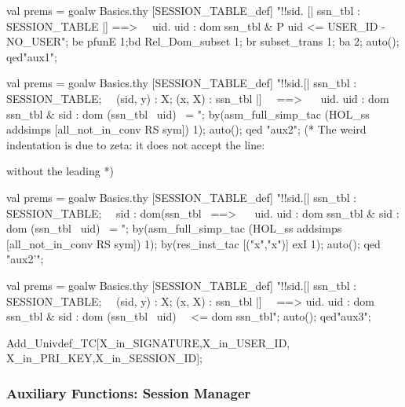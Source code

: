 \documentclass[a4paper,pdftex]{article}
\newenvironment{holz-proof}{\comment}{\endcomment}
\begin{document}
\begin{holz-proof}
val prems = goalw Basics.thy [SESSION_TABLE_def]
"!!sid. [| ssn_tbl : SESSION_TABLE |] ==>                        \
\       {uid. uid : dom ssn_tbl & P uid}  <= USER_ID - {NO_USER}";
be pfunE 1;bd Rel_Dom_subset 1;
br subset_trans 1; ba 2;
auto();
qed"aux1";


 val prems = goalw Basics.thy [SESSION_TABLE_def]
 "!!sid.[| ssn_tbl : SESSION_TABLE;                               \
 \         (sid, y) : X; (x, X) : ssn_tbl |]                      \
 \      ==>                                                       \
 \      { uid. uid : dom ssn_tbl & sid : dom (ssn_tbl %
 \                                                      uid)} ~= {}";
 by(asm_full_simp_tac (HOL_ss addsimps [all_not_in_conv RS sym]) 1);
 auto();
 qed "aux2";
(* The weird indentation is due to zeta: it does not accept the line:
  
  
   without the leading %
 *)

val prems = goalw Basics.thy [SESSION_TABLE_def]
"!!sid.[| ssn_tbl : SESSION_TABLE;                               \
\         sid : dom(ssn_tbl %
\      ==>                                                       \
\      { uid. uid : dom ssn_tbl & sid : dom (ssn_tbl %
\                                                      uid)} ~= {}";
by(asm_full_simp_tac (HOL_ss addsimps [all_not_in_conv RS sym]) 1);
by(res_inst_tac [("x","x")] exI 1);
auto();
qed "aux2'";


val prems = goalw Basics.thy [SESSION_TABLE_def]
"!!sid.[| ssn_tbl : SESSION_TABLE;                                \
\         (sid, y) : X; (x, X) : ssn_tbl |]                       \
\       ==> {uid. uid : dom ssn_tbl & sid : dom (ssn_tbl %
\                                                           uid)} \
\          <= dom ssn_tbl";
auto();
qed"aux3";

Add_Univdef_TC[X_in_SIGNATURE,X_in_USER_ID,
               X_in_PRI_KEY,X_in_SESSION_ID];

\end{holz-proof}



\subsubsection{Auxiliary Functions: Session Manager} \label{ses-man-sec}

\zsection[Basics]{SessionManager}
\end{document}
